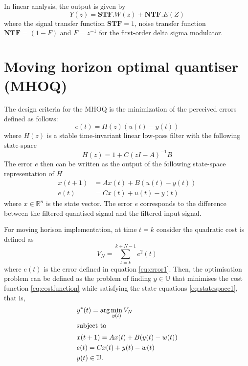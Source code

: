 \documentclass[a4paper]{article}
\begin{document}
In linear analysis, the output is given by 
\begin{equation}
	Y(z) = \textbf{STF}. W(z) + \textbf{NTF} .E(Z)
\end{equation}
where the signal transfer function $\textbf{STF} = 1$, noise transfer function $\textbf{NTF} =  (1-F)$ 
and $F = z^{-1}$ for the first-order delta sigma modulator. 

\section{Moving horizon optimal quantiser (MHOQ)}
The design criteria for the MHOQ is the minimization of the perceived errors defined as follows:
\begin{equation}
	e(t) = H(z)(u(t)-y(t))
	\label{eq:error1}
\end{equation}
where  $H(z)$  is  a stable time-invariant linear low-pass filter with the following state-space
\begin{equation}
	\label{eq:filter_statespace}
	H(z) = 1 + C(z I - A)^{-1} B
\end{equation}
The error $e$  then can be written as the output of the following state-space representation of $H$
\begin{equation}
	\begin{aligned}
		x(t+1) &= A x(t) + B (u(t)-y(t))		\\
		e(t) &= Cx(t) + u(t)-y(t)
	\end{aligned}
	\label{eq:statespace1}
\end{equation}
where $x \in \mathbb{R}^{n}$ is the state vector.  The error $e$ corresponds to the difference between the filtered quantised signal and the filtered input signal. 

For moving horison implementation, at time $t=k$ consider the quadratic cost is defined as
\begin{equation}
V_{N} = \sum_{t=k}^{k+N-1} e^{2}(t)
	\label{eq:costfunction}
\end{equation}
where $e(t)$ is the error defined in equation \eqref{eq:error1}.  Then, the optimisation problem can be defined as the problem of finding $y \in \mathbb{U}$ that minimises  the cost function \eqref{eq:costfunction} while satisfying the state equations \eqref{eq:statespace1}, that is,
\begin{subequations}\label{eq:optproblem2}
	\begin{align}
		& y^{\ast}(t) = \arg  \min_{y(t) }	V_{N} \\
		\intertext{subject to}
		&x(t+1) = A x(t) + B (y(t)-w(t))		\\
		&e(t) = Cx(t) + y(t)-w(t)		\\
		&y(t) \in \mathbb{U}.
	\end{align}
\end{subequations}
\end{document}
